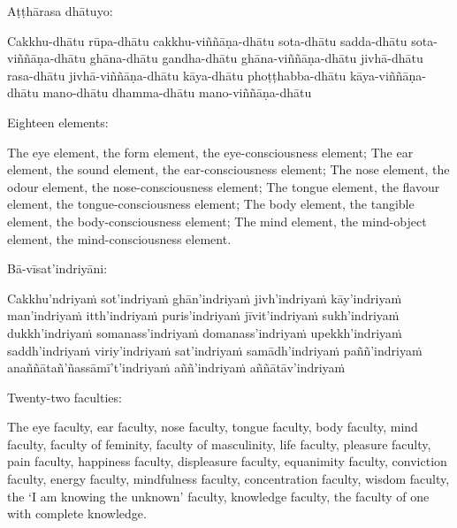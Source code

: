\suttaRef{[MN 148]}

\ifninebythirteen\clearpage\fi

\begin{pali-hang-continued}
  Aṭṭhārasa dhātuyo:
  \begin{pali-hang}
    Cakkhu-dhātu rūpa-dhātu cakkhu-viññāṇa-dhātu sota-dhātu sadda-dhātu sota-viññāṇa-dhātu ghāna-dhātu gandha-dhātu ghāna-viññāṇa-dhātu \ifafive\clearpage\fi jivhā-dhātu rasa-dhātu jivhā-viññāṇa-dhātu kāya-dhātu phoṭṭhabba-dhātu kāya-viññāṇa-dhātu mano-dhātu dhamma-dhātu mano-viññāṇa-dhātu
  \end{pali-hang}
\end{pali-hang-continued}

\begin{english-verses}
  Eighteen elements:
  \begin{english-hang-together-verses}
    The eye element, the form element, the eye-consciousness element; The ear element, the sound element, the ear-consciousness element; The nose element, the odour element, the nose-consciousness element; The tongue element, the flavour element, the tongue-consciousness element; The body element, the tangible element, the body-consciousness element; The mind element, the mind-object element, the mind-consciousness element.
  \end{english-hang-together-verses}
\end{english-verses}

\suttaRef{[MN 115]}

\begin{pali-hang-continued}
  Bā-vīsat'indriyāni:\makeatletter\hyperlink{endnote131-appendix}\makeatother
  \begin{pali-hang}
    Cakkhu'ndriyaṁ sot'indriyaṁ ghān'indriyaṁ jivh'indriyaṁ kāy'indriyaṁ man'indriyaṁ itth'indriyaṁ puris'indriyaṁ jīvit'indriyaṁ sukh'indriyaṁ dukkh'indriyaṁ somanass'indriyaṁ domanass'indriyaṁ upekkh'indriyaṁ saddh'indriyaṁ viriy'indriyaṁ sat'indriyaṁ samādh'indriyaṁ paññ'indriyaṁ anaññātañ'ñassāmī't'indriyaṁ aññ'indriyaṁ aññātāv'indriyaṁ
  \end{pali-hang}
\end{pali-hang-continued}

\begin{english-verses}
  Twenty-two faculties:
  \begin{english-hang-together-verses}
    The eye faculty, ear faculty, nose faculty, tongue faculty, body faculty, mind faculty, faculty of feminity, faculty of masculinity, life faculty, pleasure faculty, pain faculty, happiness faculty, displeasure faculty, equanimity faculty, conviction faculty, energy faculty, mindfulness faculty, concentration faculty, wisdom faculty, the `I am knowing the unknown' faculty, knowledge faculty, the faculty of one with complete knowledge.
  \end{english-hang-together-verses}
\end{english-verses}

